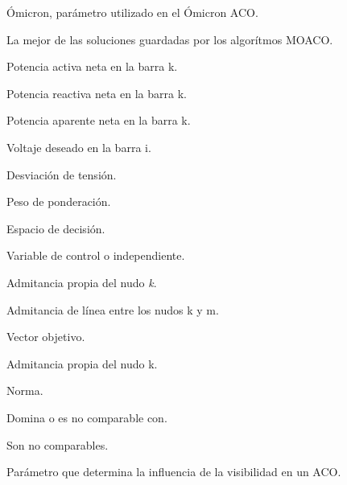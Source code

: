 \item[$O        $] Ómicron, par\'ametro utilizado en el Ómicron ACO.%
\item[$P^*        $] La mejor de las soluciones guardadas por los algor\'itmos MOACO.%
\item[$P_k        $] Potencia activa neta en la barra k.%
\item[$Q_k        $] Potencia reactiva neta en la barra k.%
\item[$S_k        $] Potencia aparente neta en la barra k.%
\item[${V_i}^*        $] Voltaje deseado en la barra i.%
\item[$\Delta V        $] Desviaci\'on de tensi\'on.%
\item[$w_j        $] Peso de ponderaci\'on.%
\item[$\textbf{X}        $] Espacio de decisi\'on.%
\item[$\textbf{x} \in{{R}^n}        $] Variable de control o independiente.%
\item[$\textit{Y_{kk}}        $] Admitancia propia del nudo \textit{k}.%
\item[$y_{km}        $] Admitancia de l\'inea entre los nudos k y m.%
\item[$\textbf{y}        $] Vector objetivo.%
\item[$Y_{kk}        $] Admitancia propia del nudo k.%
\item[$||.||        $] Norma.%
\item[$\triangleright        $] Domina o es no comparable con.%
\item[$\sim        $] Son no comparables.%
\item[$\beta        $] Par\'ametro que determina la influencia de la visibilidad en un ACO.%
